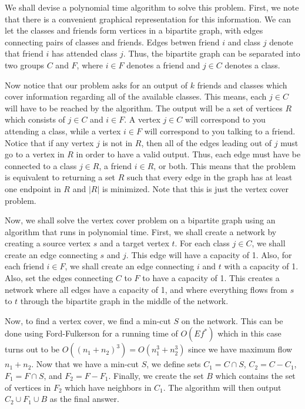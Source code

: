 \documentclass[psamsfonts]{amsart}
\newenvironment{sol}{{\bfseries Solution}}{\qedsymbol}
\theoremstyle{definition}
\theoremstyle{remark}
\numberwithin{equation}{section}
\begin{document}
\begin{sol}
We shall devise a polynomial time algorithm to solve this problem. First, we note that there is a convenient graphical representation for this information. We can let the classes and friends form vertices in a bipartite graph, with edges connecting pairs of classes and friends. Edges betwen friend $i$ and class $j$ denote that friend $i$ has attended class $j$. Thus, the bipartite graph can be separated into two groups $C$ and $F$, where $i \in F$ denotes a friend and $j \in C$ denotes a class. 

Now notice that our problem asks for an output of $k$ friends and classes which cover information regarding all of the available classes. This means, each $j \in C$ will have to be reached by the algorithm. The output will be a set of vertices $R$ which consists of $j \in C$ and $i \in F$. A vertex $j \in C$ will correspond to you attending a class, while a vertex $i \in F$ will correspond to you talking to a friend. Notice that if any vertex $j$ is not in $R$, then all of the edges leading out of $j$ must go to a vertex in $R$ in order to have a valid output. Thus, each edge must have be connected to a class $j \in R$, a friend $i \in R$, or both. This means that the problem is equivalent to returning a set $R$ such that every edge in the graph has at least one endpoint in $R$ and $|R|$ is minimized. Note that this is just the vertex cover problem.

Now, we shall solve the vertex cover problem on a bipartite graph using an algorithm that runs in polynomial time. First, we shall create a network by creating a source vertex $s$ and a target vertex $t$. For each class $j \in C$, we shall create an edge connecting $s$ and $j$. This edge will have a capacity of 1. Also, for each friend $i \in F$, we shall create an edge connecting $i$ and $t$ with a capacity of 1. Also, set the edges connecting $C$ to $F$ to have a capacity of 1. This creates a network where all edges have a capacity of 1, and where everything flows from $s$ to $t$ through the bipartite graph in the middle of the network.

Now, to find a vertex cover, we find a min-cut $S$ on the network. This can be done using Ford-Fulkerson for a running time of $O(Ef^*)$ which in this case turns out to be $O((n_1 + n_2)^3) = O(n_1^3 + n_2^3)$ since we have maximum flow $n_1 + n_2$. Now that we have a min-cut $S$, we define sets $C_1 = C \cap S$, $C_2 = C - C_1$, $F_1 = F \cap S$, and $F_2 = F - F_1$. Finally, we create the set $B$ which contains the set of vertices in $F_2$ which have neighbors in $C_1$. The algorithm will then output $C_2 \cup F_1 \cup B$ as the final answer.  


\end{sol}
\end{document}
